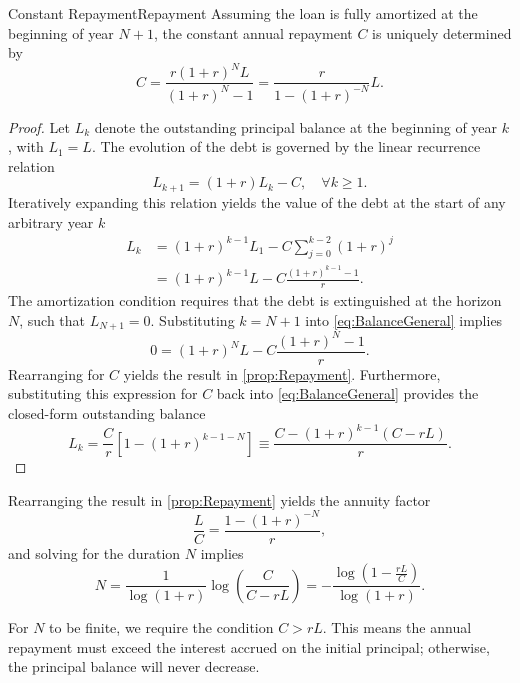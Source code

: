 \begin{prop}{Constant Repayment}{Repayment}
	Assuming the loan is fully amortized at the beginning of year $N+1$, the constant annual repayment $C$ is uniquely determined by
	\begin{equation}
		C = \frac{r(1+r)^N L}{(1+r)^N - 1} = \frac{r}{1 - (1+r)^{-N}} L.
	\end{equation}
\end{prop}
\begin{proof}
	Let $L_k$ denote the outstanding principal balance at the beginning of year $k$, with $L_1 = L$. The evolution of the debt is governed by the linear recurrence relation
	\begin{equation}
		L_{k+1} = (1+r)L_k - C, \quad \forall k \ge 1.
	\end{equation}
	Iteratively expanding this relation yields the value of the debt at the start of any arbitrary year $k$
	\begin{align}
		L_k & = (1+r)^{k-1}L_1 - C \sum_{j=0}^{k-2} (1+r)^j \nonumber                 \\
		    & = (1+r)^{k-1}L - C \frac{(1+r)^{k-1} - 1}{r}. \label{eq:BalanceGeneral}
	\end{align}
	The amortization condition requires that the debt is extinguished at the horizon $N$, such that $L_{N+1} = 0$. Substituting $k=N+1$ into \cref{eq:BalanceGeneral} implies
	\[
		0 = (1+r)^N L - C \frac{(1+r)^N - 1}{r}.
	\]
	Rearranging for $C$ yields the result in \ref{prop:Repayment}. Furthermore, substituting this expression for $C$ back into \cref{eq:BalanceGeneral} provides the closed-form outstanding balance
	\begin{equation}
		L_k = \frac{C}{r} \left[ 1 - (1+r)^{k-1-N} \right] \equiv \frac{C - (1+r)^{k-1}(C - rL)}{r}.
	\end{equation}
\end{proof}
\noindent Rearranging the result in \ref{prop:Repayment} yields the annuity factor
\begin{equation}
	\frac{L}{C} = \frac{1 - (1+r)^{-N}}{r},
\end{equation}
and solving for the duration $N$ implies
\begin{equation}
	N = \frac{1}{\log(1+r)} \log \left( \frac{C}{C - rL} \right) = - \frac{\log(1 - \frac{rL}{C})}{\log(1+r)}.
\end{equation}
\begin{xtip}
	For $N$ to be finite, we require the condition $C > rL$. This means the annual repayment must exceed the interest accrued on the initial principal; otherwise, the principal balance will never decrease.
\end{xtip}

